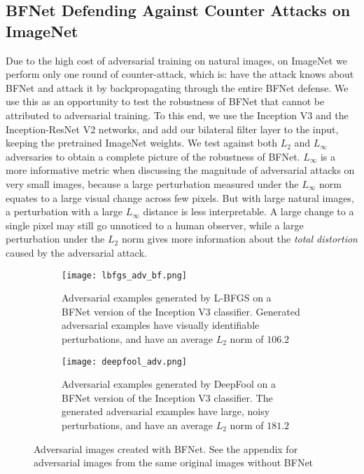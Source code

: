 \documentclass{article} %
\begin{document}
\subsection{BFNet Defending Against Counter Attacks on ImageNet}
Due to the high cost of adversarial training on natural images, on ImageNet we perform only one round of counter-attack, which is: have the attack knows about BFNet and attack it by backpropagating through the entire BFNet defense. We use this as an opportunity to test the robustness of BFNet that cannot be attributed to adversarial training. To this end, we use the Inception V3 and the Inception-ResNet V2 networks, and add our bilateral filter layer to the input, keeping the pretrained ImageNet weights. We test against both $L_2$ and $L_\infty$  adversaries to obtain a complete picture of the robustness of BFNet. $L_\infty$ is a more informative metric when discussing the magnitude of adversarial attacks on very small images, because a large perturbation measured under the $L_\infty$ norm equates to a large visual change across few pixels. But with large natural images, a perturbation with a large $L_\infty$ distance is less interpretable. A large change to a single pixel may still go unnoticed to a human observer, while a large perturbation under the $L_2$ norm gives more information about the \textit{total distortion} caused by the adversarial attack. 

\begin{figure}[htb]
\label{fig:l2_images}
\centering
\captionsetup[subfigure]{}
\begin{subfigure}{\textwidth}
  \centering
  \texttt{[image: lbfgs\_adv\_bf.png]}
\vskip -0.1in
  \caption{Adversarial examples generated by L-BFGS on a BFNet version of the Inception V3 classifier. Generated adversarial examples have visually identifiable perturbations, and have an average $L_2$ norm of $106.2$ }
\end{subfigure}
\vskip -0.03in
\begin{subfigure}{\textwidth}
  \centering
  \texttt{[image: deepfool\_adv.png]}
\vskip -0.1in
  \caption{Adversarial examples generated by DeepFool on a BFNet version of the Inception V3 classifier. The generated adversarial examples have large, noisy perturbations, and have an average $L_2$ norm of $181.2$ }
\end{subfigure}
\vskip -0.08in
\caption{ Adversarial images created with BFNet. See the appendix for adversarial images from the same original images without BFNet}
\label{fig:bfnet_imagenet}
\vskip -0.1in
\end{figure}
\end{document}
